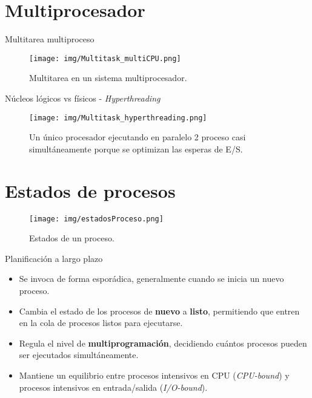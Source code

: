 \documentclass{beamer}
\begin{document}
\section{Multiprocesador}

\begin{frame}{Multitarea multiproceso}
  \begin{figure}
        \centering
        \texttt{[image: img/Multitask\_multiCPU.png]} 
        \caption{Multitarea en un sistema multiprocesador.}
    \end{figure}
\end{frame}

\begin{frame}{Núcleos lógicos vs físicos - \textit{Hyperthreading}}
  \begin{figure}
        \centering
        \texttt{[image: img/Multitask\_hyperthreading.png]} 
        \caption{Un único procesador ejecutando en paralelo 2 proceso casi simultáneamente porque se optimizan las esperas de E/S.}
    \end{figure}
\end{frame}

\section{Estados de procesos}

\begin{frame}
  \begin{figure}
        \centering
        \texttt{[image: img/estadosProceso.png]} 
        \caption{Estados de un proceso.}
    \end{figure}
\end{frame}

\begin{frame}{Planificación a largo plazo}
    \begin{itemize}
        \item Se invoca de forma esporádica, generalmente cuando se inicia un nuevo proceso.
        \item Cambia el estado de los procesos de \textbf{nuevo} a \textbf{listo}, permitiendo que entren en la cola de procesos listos para ejecutarse.
        \item Regula el nivel de \textbf{multiprogramación}, decidiendo cuántos procesos pueden ser ejecutados simultáneamente.
        \item Mantiene un equilibrio entre procesos intensivos en CPU (\textit{CPU-bound}) y procesos intensivos en entrada/salida (\textit{I/O-bound}).
    \end{itemize}

\end{frame}
\end{document}
